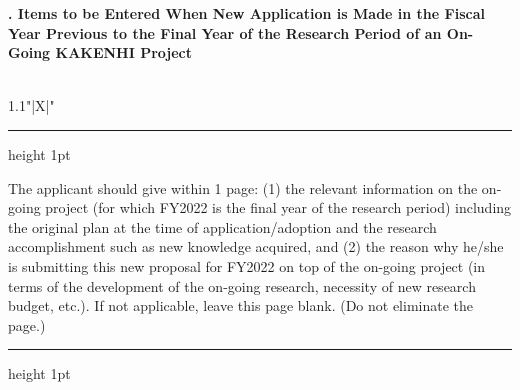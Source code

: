 \documentclass[8pt]{extarticle}
\makeatletter
\newcommand{\thickhline}{%
	\noalign {\ifnum 0=`}\fi \hrule height 1pt
	\futurelet \reserved@a \@xhline
}
\makeatother
\begin{document}
	
\noindent\textbf{\fontsize{12}{12}. Items to be Entered When New Application is Made in the Fiscal Year Previous to the Final Year of the Research Period of an On-Going KAKENHI Project }\\
\indent {}\\
\begin{tabularx}{1.1\linewidth}{"|X|"}
	\thickhline
	The applicant should give within 1 page: (1) the relevant information on the on-going project (for which FY2022 is the final year of the research period) including the original plan at the time of application/adoption and the research accomplishment such as new knowledge acquired, and (2) the reason why he/she is submitting this new proposal for FY2022 on top of the on-going project (in terms of the development of the on-going research, necessity of new research budget, etc.). If not applicable, leave this page blank. (Do not eliminate the page.) 
	\\
	\thickhline
\end{tabularx}
\end{document}
